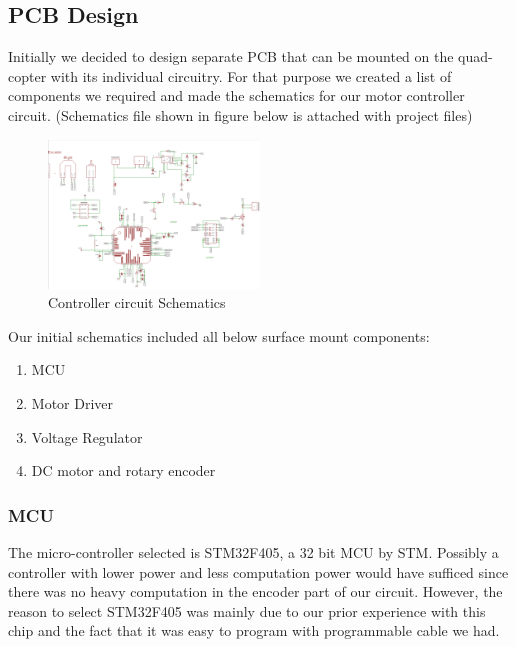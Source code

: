 \subsection{PCB Design}
Initially we decided to design separate PCB that can be mounted on the quad-copter with its individual circuitry. For that purpose we created a list of components we required and made the schematics for our motor controller circuit. (Schematics file shown in figure below is attached with project files)
\newline

\begin{figure}[H]
\centering
\includegraphics[width=0.5\textwidth]{./Amir_img/schematics.png}
\caption{Controller circuit Schematics}
\end{figure}

 Our initial schematics included all below surface mount components:
 
\begin{enumerate}
\item MCU
\item  Motor Driver
\item Voltage Regulator
\item DC motor and rotary encoder
\end{enumerate}
 
\subsubsection{MCU}
The micro-controller selected is STM32F405, a 32 bit MCU by STM. Possibly a controller with lower power and less computation power would have sufficed since there was no heavy computation in the encoder part of our circuit. However, the reason to select STM32F405 was mainly due to our prior experience with this chip and the fact that it was easy to program with programmable cable we had. 

